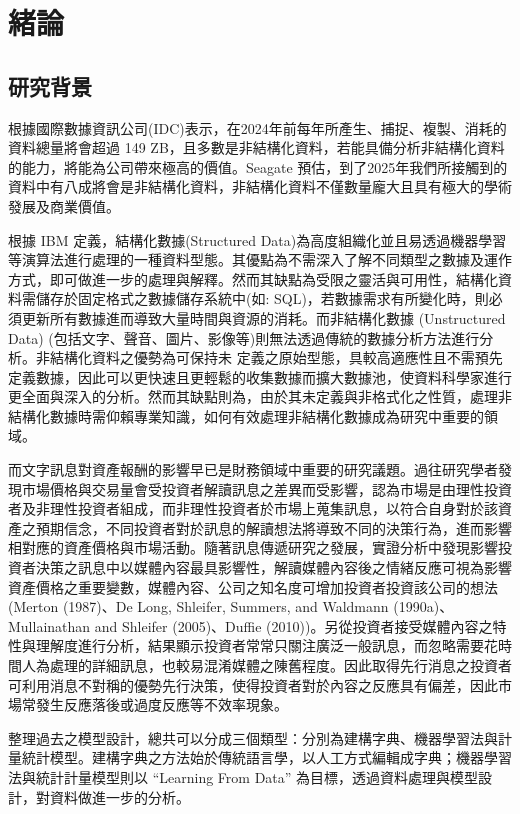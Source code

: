\chapter{緒論}
\label{c:intro}

\section{研究背景}
根據國際數據資訊公司(IDC)表示，在2024年前每年所產生、捕捉、複製、消耗的資料總量將會超過 149 ZB，且多數是非結構化資料，若能具備分析非結構化資料的能力，將能為公司帶來極高的價值。Seagate 預估，到了2025年我們所接觸到的資料中有八成將會是非結構化資料，非結構化資料不僅數量龐大且具有極大的學術發展及商業價值。

根據 IBM 定義，結構化數據(Structured Data)為高度組織化並且易透過機器學習等演算法進行處理的一種資料型態。其優點為不需深入了解不同類型之數據及運作方式，即可做進一步的處理與解釋。然而其缺點為受限之靈活與可用性，結構化資料需儲存於固定格式之數據儲存系統中(如: SQL)，若數據需求有所變化時，則必須更新所有數據進而導致大量時間與資源的消耗。而非結構化數據 (Unstructured Data) (包括文字、聲音、圖片、影像等)則無法透過傳統的數據分析方法進行分析。非結構化資料之優勢為可保持未
定義之原始型態，具較高適應性且不需預先定義數據，因此可以更快速且更輕鬆的收集數據而擴大數據池，使資料科學家進行更全面與深入的分析。然而其缺點則為，由於其未定義與非格式化之性質，處理非結構化數據時需仰賴專業知識，如何有效處理非結構化數據成為研究中重要的領域。

而文字訊息對資產報酬的影響早已是財務領域中重要的研究議題。過往研究學者發現市場價格與交易量會受投資者解讀訊息之差異而受影響，認為市場是由理性投資者及非理性投資者組成，而非理性投資者於市場上蒐集訊息，以符合自身對於該資產之預期信念，不同投資者對於訊息的解讀想法將導致不同的決策行為，進而影響相對應的資產價格與市場活動。隨著訊息傳遞研究之發展，實證分析中發現影響投資者決策之訊息中以媒體內容最具影響性，解讀媒體內容後之情緒反應可視為影響資產價格之重要變數，媒體內容、公司之知名度可增加投資者投資該公司的想法 (Merton (1987)、De Long, Shleifer, Summers, and Waldmann (1990a)、Mullainathan and Shleifer (2005)、Duffie (2010))。另從投資者接受媒體內容之特性與理解度進行分析，結果顯示投資者常常只關注廣泛一般訊息，而忽略需要花時間人為處理的詳細訊息，也較易混淆媒體之陳舊程度。因此取得先行消息之投資者可利用消息不對稱的優勢先行決策，使得投資者對於內容之反應具有偏差，因此市場常發生反應落後或過度反應等不效率現象。

整理過去之模型設計，總共可以分成三個類型：分別為建構字典、機器學習法與計量統計模型。建構字典之方法始於傳統語言學，以人工方式編輯成字典；機器學習法與統計計量模型則以 “Learning From Data” 為目標，透過資料處理與模型設計，對資料做進一步的分析。

